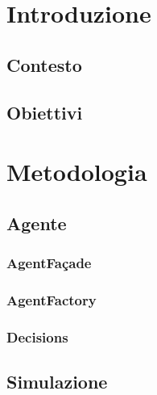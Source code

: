 \documentclass[compress]{beamer}
\begin{document}
\begin{frame}[plain]
    \titlepage
\end{frame}

\section*{Introduzione}

\subsection*{Contesto}

\subsection*{Obiettivi}

\section*{Metodologia}

\subsection*{Agente}

\subsubsection*{AgentFaçade}

\subsubsection*{AgentFactory}

\subsubsection*{Decisions}

\subsection*{Simulazione}
\end{document}
